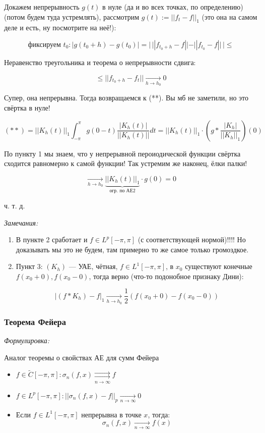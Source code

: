 \documentclass{article}
\def\rsh#1{\underset{#1}{\rightrightarrows}}
\def\goesto#1{\underset{#1}{\longrightarrow}}
\def\toinf#1{\goesto{#1 \rightarrow \infty}}
\def\ntoinf{\toinf{n}}
\begin{document}
Докажем непрерывность $g(t)$ в нуле (да и во всех точках, по определению) (потом будем туда устремлять), рассмотрим $g(t) := ||f_t - f||_1$ (это она на самом деле и есть, ну посмотрите на неё!):

\[\text{фиксируем } t_0: |g(t_0 + h) - g(t_0)| = | \,||f_{t_0 + h} - f|| - ||f_{t_0} - f|| \,| \le \]

Неравенство треугольника и теорема о непрерывности сдвига:

\[\le ||f_{t_0 + h} - f_t|| \goesto{h \rightarrow h_0} 0\]

Супер, она непрерывна. Тогда возвращаемся к (**). Вы мб не заметили, но это свёртка в нуле!

\[ (**) = ||K_h(t)||_1\int_{-\pi}^{\pi} g(0 - t) \frac{|K_h(t)|}{||K_h(t)||}dt = ||K_h(t)||_1 \cdot \left(g * \frac{|K_h|}{||K_h||_1}\right)(0)\]

По пункту 1 мы знаем, что у непрерывной пероиодической функции свёртка сходится равномерно к самой функции! Так устремим же наконец, ёлки палки!

\[\goesto{h \rightarrow h_0} \underbrace{||K_h(t)||_1}_{\text{огр. по АЕ2}} \cdot g(0) = 0\]

ч. т. д.

\textit{Замечания:} 

\begin{enumerate}
    \item В пункте 2 сработает и $f \in L^p[-\pi, \pi]$ (с соответствующей нормой)!!!! Но доказывать мы это не будем, там примерно то же самое только громоздкое.
    \item Пункт 3: $(K_h)$ --- УАЕ, чётная, $f \in L^1[-\pi, \pi]$, в $x_0$ существуют конечные $f(x_0 + 0), f(x_0  - 0)$, тогда верно (что-то подонобное признаку Дини):
    
    \[|(f * K_h) - f|_1 \goesto{h \rightarrow h_0} \frac{1}{2}(f(x_0 + 0) - f(x_0 - 0))\]
\end{enumerate}

\subsubsection{Теорема Фейера }
\textit{Формулировка:}

Аналог теоремы о свойствах АЕ для сумм Фейера

\begin{itemize}
    \item $f \in \tilde{C}[-\pi, \pi]: \sigma_n(f, x) \rsh{n \rightarrow \infty} f$
    \item $f \in L^p[-\pi, \pi]: ||\sigma_n(f, x) - f||_p \ntoinf 0$
    \item Если $f \in L^1[-\pi, \pi]$ непрерывна в точке $x$, тогда:
    \[\sigma_n(f, x) \ntoinf f(x)\]
\end{itemize}
\end{document}
